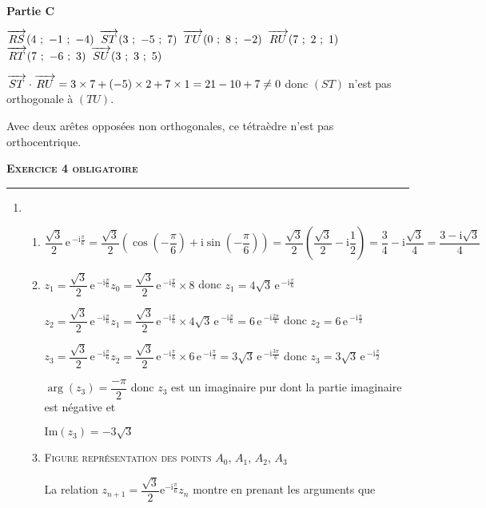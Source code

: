 \documentclass[10pt]{article}
\newcommand{\vect}[1]{\overrightarrow{\,\mathstrut#1\,}}
\newcommand{\e}{\mathrm{\,e\,}}%
\begin{document}
\textbf{Partie C}\smallskip 

$\vect{RS}(4~;~-1~;~-4)$ \quad $\vect{ST}(3~;~-5~;~7)$ \quad $\vect{TU} (0~;~8~;~-2)$ \quad $\vect{RU}(7~;~2~;~1)$ \quad $\vect{RT}(7~;~-6~;~3)$ \quad $\vect{SU} (3~;~3~;~5)$\smallskip 

$\vect{ST}\cdot\vect{RU}=3\times 7 + (-5) \times 2 + 7 \times 1 =21-10+7\neq 0$ donc $(ST)$ n'est pas orthogonale à $(TU)$.\smallskip 

Avec deux arêtes opposées non orthogonales, ce tétraèdre n'est pas orthocentrique.\bigskip 

\textbf{\textsc{Exercice 4 obligatoire}} \smallskip  \hrule \medskip 

\begin{enumerate}
	\item
	\begin{enumerate}
		\item $\dfrac{\sqrt{3}}{2} \e^{-\text{i} \frac{\pi}{6}} = \dfrac{\sqrt{3}}{2} \left( \cos\left(-\dfrac{\pi}{6}\right) + \text{i}\sin\left(-\dfrac{\pi}{6}\right) \right) = \dfrac{\sqrt{3}}{2} \left( \dfrac{\sqrt{3}}{2} - \text{i}\dfrac{1}{2} \right) = \dfrac{3}{4} - \text{i} \dfrac{\sqrt{3}}{4} = \dfrac{3-\text{i}\sqrt{3}}{4}$
		
	\item $z_1=\dfrac{\sqrt{3}}{2} \e^{-\text{i} \frac{\pi}{6}}z_0=\dfrac{\sqrt{3}}{2} \e^{-\text{i} \frac{\pi}{6}} \times 8$ donc $\boxed{ z_1=4\sqrt{3} \e^{-\text{i} \frac{\pi}{6}} }$\smallskip 
	
	$z_2=\dfrac{\sqrt{3}}{2} \e^{-\text{i} \frac{\pi}{6}}z_1 = \dfrac{\sqrt{3}}{2} \e^{-\text{i} \frac{\pi}{6}} \times 4\sqrt{3} \e^{-\text{i} \frac{\pi}{6}} = 6 \e^{-\text{i} \frac{2\pi}{6}}$ donc $\boxed{ z_2=6 \e^{-\text{i} \frac{\pi}{3}} }$\smallskip 
	
	$z_3=\dfrac{\sqrt{3}}{2} \e^{-\text{i} \frac{\pi}{6}}z_2 = \dfrac{\sqrt{3}}{2} \e^{-\text{i} \frac{\pi}{6}} \times 6 \e^{-\text{i} \frac{\pi}{3}} = 3\sqrt{3} \e^{-\text{i} \frac{3\pi}{6}}$ donc $\boxed{ z_3=3\sqrt{3} \e^{-\text{i} \frac{\pi}{2}} }$\medskip 
	
	$\arg(z_3) = \dfrac{-\pi}{2}$ donc $z_3$ est un imaginaire pur dont la partie imaginaire est négative et 
	
$\boxed{ \text{Im}\left(z_3\right) = - 3\sqrt{3} }$
	\item \textsc{Figure représentation des points $A_0$, \:$A_1$, \:$A_2$, \:$A_3$}

La relation $z_{n+1} = \dfrac{\sqrt{3}}{2}\text{e}^{- \text{i}\frac{\pi}{6}}z_n$ montre en prenant les arguments que 


\end{enumerate}
\end{enumerate}
\end{document}
